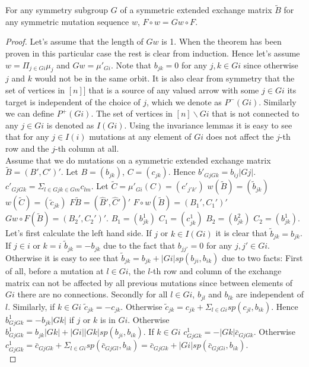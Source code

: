 \begin{theorem}
For any symmetry subgroup $G$ of a symmetric extended exchange matrix $\tilde{B}$ for any symmetric mutation sequence $w$, $F\circ w=Gw\circ F$.\\
\end{theorem}
\begin{proof}
\indent Let's assume that the length of $Gw$ is 1. When the theorem has been proven in this particular case the rest is clear from induction. Hence let's assume $w=\Pi_{j\in Gi} \mu_j$ and $Gw=\mu'_{Gi}$. Note that $b_{jk}=0$ for any $j,k\in Gi$ since otherwise $j$ and $k$ would not be in the same orbit. It is also clear from symmetry that the set of vertices in $[n]]$ that is a source of any valued arrow with some $j\in Gi$ its target is independent of the choice of $j$, which we denote as $P^{-}(Gi)$. Similarly we can define $P^+(Gi)$. The set of vertices in $[n]\backslash Gi$ that is not connected to any $j\in Gi$ is denoted as $I(Gi)$. Using the invariance lemmas it is easy to see that for any $j\in I(i)$ mutations at any element of $Gi$ does not affect the $j$-th row and the $j$-th column at all.\\
\indent Assume that we do mutations on a symmetric extended exchange matrix $\tilde{B}=(B',C')'$. Let $B=(b_{jk})$, $C=(c_{jk})$. Hence $b'_{GjGk}=b_{ij}|Gj|$. $c'_{GjGk}=\Sigma_{l\in Gj k\in Gm}c_{lm}$.  Let $\tilde{C}=\mu'_{Gi}(C)=(c'_{j'k'})$ $w(\tilde{B})=(\tilde{b}_{jk})$ $w(\tilde{C})=(\tilde{c}_{jk})$ $F\tilde{B}=(\hat{B}',\hat{C}')'$ $F\circ w(\tilde{B})=(B_1',C_1')'$  $Gw\circ F(\tilde{B})=(B_2',C_2')'$. $B_1=(b^1_{jk})$ $C_1=(c^1_{jk})$ $B_2=(b^2_{jk})$ $C_2=(b^1_{jk})$.\\
\indent Let's first calculate the left hand side. If $j$ or $k\in I(Gi)$ it is clear that $\tilde{b}_{jk}=b_{jk}$. If $j\in i$ or $k=i$ $\tilde{b}_{jk}=-b_{jk}$ due to the fact that $b_{jj'}=0$ for any $j,j'\in Gi$. Otherwise it is easy to see that $\tilde{b}_{jk}=b_{jk}+|Gi|sp(b_{ji},b_{ik})$ due to two facts: First of all, before a mutation at $l\in Gi$, the $l$-th row and column of the exchange matrix can not be affected by all previous mutations since between elements of $Gi$ there are no connections. Secondly for all $l\in Gi$, $b_{jl}$ and $b_{lk}$ are independent of $l$. Similarly, if $k\in Gi$ $\tilde{c}_{jk}=-c_{jk}$. Otherwise $\tilde{c}_{jk}=c_{jk}+\Sigma_{l\in Gi} sp(c_{jl}, b_{ik})$. Hence $b^1_{GjGk}=-b_{jk}|Gk|$ if $j$ or $k$ is in $Gi$. Otherwise $b^1_{GjGk}=b_{jk}|Gk|+|Gi||Gk|sp(b_{ji},b_{ik})$. If $k\in Gi$ $c^1_{GjGk}=-|Gk|\bar{c}_{GjGk}$. Otherwise $c^1_{GjGk}=\bar{c}_{GjGk}+\Sigma_{l\in Gi} sp(\bar{c}_{GjGl}, b_{ik})=\bar{c}_{GjGk}+|Gi|sp(\bar{c}_{GjGi},b_{ik})$.\\

\end{proof}

